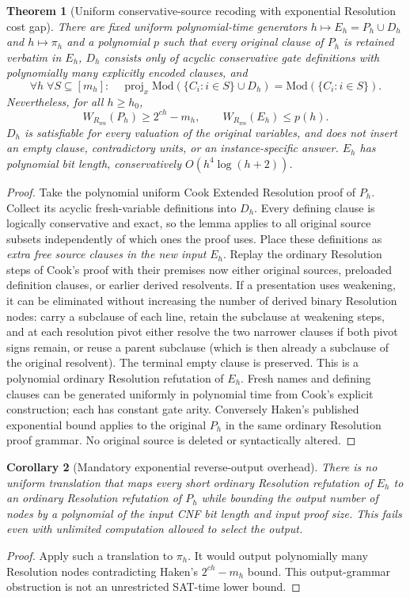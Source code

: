 \documentclass[11pt]{article}
\newtheorem{theorem}{Theorem}
\newtheorem{corollary}[theorem]{Corollary}
\begin{document}
\begin{theorem}[Uniform conservative-source recoding with exponential Resolution cost gap]
There are fixed uniform polynomial-time generators $h\mapsto E_h=P_h\cup D_h$ and $h\mapsto\pi_h$ and a polynomial $p$ such that every original clause of $P_h$ is retained \emph{verbatim} in $E_h$, $D_h$ consists only of acyclic conservative gate definitions with polynomially many explicitly encoded clauses, and
\[
\forall h\;\forall S\subseteq[m_h]:\quad
\operatorname{proj}_{x}\mathrm{Mod}(\{C_i:i\in S\}\cup D_h)
=\mathrm{Mod}(\{C_i:i\in S\}).
\]
Nevertheless, for all $h\ge h_0$,
\[
\boxed{W_{R_{\mathrm{res}}}(P_h)\ge 2^{ch}-m_h,\qquad
 W_{R_{\mathrm{res}}}(E_h)\le p(h).}
\]
$D_h$ is satisfiable for \emph{every} valuation of the original variables, and does not insert an empty clause, contradictory units, or an instance-specific answer. $E_h$ has polynomial bit length, conservatively $O(h^4\log(h+2))$.
\end{theorem}
\begin{proof}
Take the polynomial uniform Cook Extended Resolution proof of $P_h$. Collect its acyclic fresh-variable definitions into $D_h$. Every defining clause is logically conservative and exact, so the lemma applies to all original source subsets independently of which ones the proof uses. Place these definitions as \emph{extra free source clauses in the new input} $E_h$. Replay the ordinary Resolution steps of Cook's proof with their premises now either original sources, preloaded definition clauses, or earlier derived resolvents. If a presentation uses weakening, it can be eliminated without increasing the number of derived binary Resolution nodes: carry a subclause of each line, retain the subclause at weakening steps, and at each resolution pivot either resolve the two narrower clauses if both pivot signs remain, or reuse a parent subclause (which is then already a subclause of the original resolvent). The terminal empty clause is preserved. This is a polynomial ordinary Resolution refutation of $E_h$. Fresh names and defining clauses can be generated uniformly in polynomial time from Cook's explicit construction; each has constant gate arity. Conversely Haken's published exponential bound applies to the original $P_h$ in the same ordinary Resolution proof grammar. No original source is deleted or syntactically altered.
\end{proof}

\begin{corollary}[Mandatory exponential reverse-output overhead]
There is no uniform translation that maps every short ordinary Resolution refutation of $E_h$ to an ordinary Resolution refutation of $P_h$ while bounding the output number of nodes by a polynomial of the input CNF bit length and input proof size. This fails even with unlimited computation allowed to select the output.
\end{corollary}
\begin{proof}
Apply such a translation to $\pi_h$. It would output polynomially many Resolution nodes contradicting Haken's $2^{ch}-m_h$ bound. This output-grammar obstruction is not an unrestricted SAT-time lower bound.
\end{proof}
\end{document}
